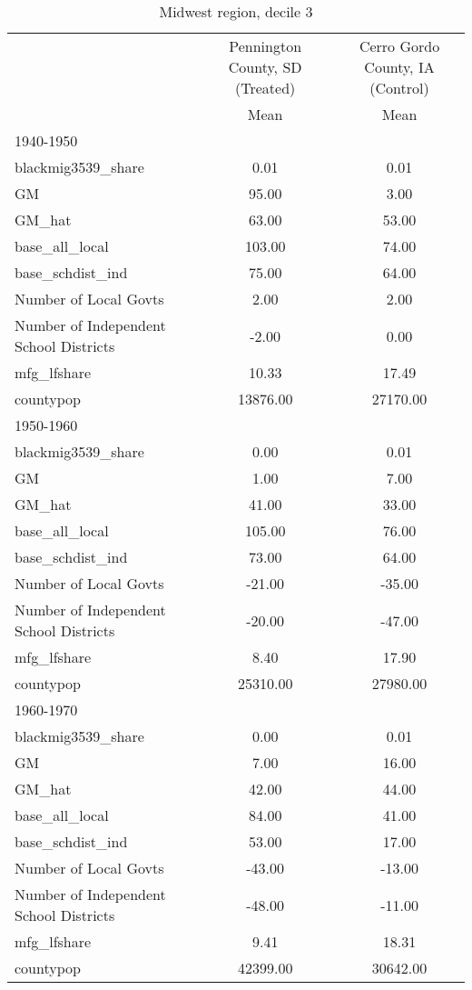 \begin{table}[htbp]\centering
\def\sym#1{\ifmmode^{#1}\else\(^{#1}\)\fi}
\caption{Midwest region, decile 3 \label{tab1}}
\begin{tabular}{l*{2}{c}}
\toprule
                    &\multicolumn{1}{c}{Pennington County, SD (Treated)}&\multicolumn{1}{c}{Cerro Gordo County, IA (Control)}\\
                    &        Mean&        Mean\\
\midrule
1940-1950           &            &            \\
blackmig3539\_share  &        0.01&        0.01\\
GM                  &       95.00&        3.00\\
GM\_hat              &       63.00&       53.00\\
base\_all\_local      &      103.00&       74.00\\
base\_schdist\_ind    &       75.00&       64.00\\
Number of Local Govts&        2.00&        2.00\\
Number of Independent School Districts&       -2.00&        0.00\\
mfg\_lfshare         &       10.33&       17.49\\
countypop           &    13876.00&    27170.00\\
\midrule
1950-1960           &            &            \\
blackmig3539\_share  &        0.00&        0.01\\
GM                  &        1.00&        7.00\\
GM\_hat              &       41.00&       33.00\\
base\_all\_local      &      105.00&       76.00\\
base\_schdist\_ind    &       73.00&       64.00\\
Number of Local Govts&      -21.00&      -35.00\\
Number of Independent School Districts&      -20.00&      -47.00\\
mfg\_lfshare         &        8.40&       17.90\\
countypop           &    25310.00&    27980.00\\
\midrule
1960-1970           &            &            \\
blackmig3539\_share  &        0.00&        0.01\\
GM                  &        7.00&       16.00\\
GM\_hat              &       42.00&       44.00\\
base\_all\_local      &       84.00&       41.00\\
base\_schdist\_ind    &       53.00&       17.00\\
Number of Local Govts&      -43.00&      -13.00\\
Number of Independent School Districts&      -48.00&      -11.00\\
mfg\_lfshare         &        9.41&       18.31\\
countypop           &    42399.00&    30642.00\\
\bottomrule
\end{tabular}
\end{table}

